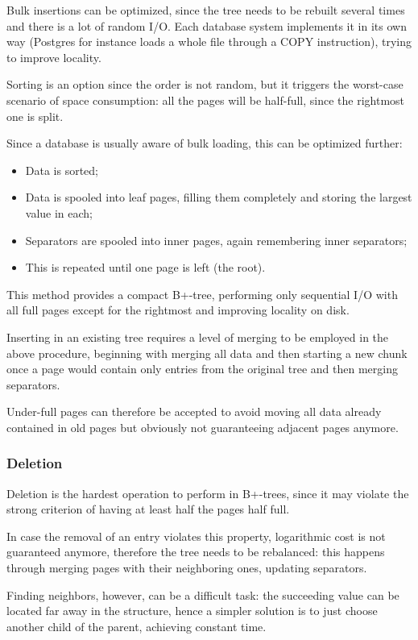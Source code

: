 Bulk insertions can be optimized, since the tree needs to be rebuilt several times and there is a lot of random I/O. Each database system implements it in its own way (Postgres for instance loads a whole file through a COPY instruction), trying to improve locality.

Sorting is an option since the order is not random, but it triggers the worst-case scenario of space consumption: all the pages will be half-full, since the rightmost one is split.

Since a database is usually aware of bulk loading, this can be optimized further:
\begin{itemize}
	\item Data is sorted;
	\item Data is spooled into leaf pages, filling them completely and storing the largest value in each;
	\item Separators are spooled into inner pages, again remembering inner separators;
	\item This is repeated until one page is left (the root).
\end{itemize}
This method provides a compact B+-tree, performing only sequential I/O with all full pages except for the rightmost and improving locality on disk.

Inserting in an existing tree requires a level of merging to be employed in the above procedure, beginning with merging all data and then starting a new chunk once a page would contain only entries from the original tree and then merging separators. 

Under-full pages can therefore be accepted to avoid moving all data already contained in old pages but obviously not guaranteeing adjacent pages anymore. 

\subsubsection{Deletion}
Deletion is the hardest operation to perform in B+-trees, since it may violate the strong criterion of having at least half the pages half full. 

In case the removal of an entry violates this property, logarithmic cost is not guaranteed anymore, therefore the tree needs to be rebalanced: this happens through merging pages with their neighboring ones, updating separators.

Finding neighbors, however, can be a difficult task: the succeeding value can be located far away in the structure, hence a simpler solution is to just choose another child of the parent, achieving constant time.

